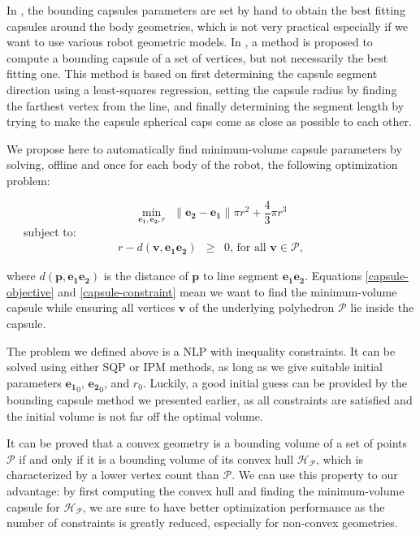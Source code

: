 In \cite{Kanoun2011}, the bounding capsules parameters are set by hand
to obtain the best fitting capsules around the body geometries, which
is not very practical especially if we want to use various robot
geometric models. In \cite{eberly20073d}, a method is proposed to
compute a bounding capsule of a set of vertices, but not necessarily
the best fitting one. This method is based on first determining the
capsule segment direction using a least-squares regression, setting
the capsule radius by finding the farthest vertex from the line, and
finally determining the segment length by trying to make the capsule
spherical caps come as close as possible to each other.

We propose here to automatically find minimum-volume capsule
parameters by solving, offline and once for each body of the robot,
the following optimization problem:

\begin{equation}
  \min_{\mathbf{e_1}, \mathbf{e_2}, r} \ \ 
  \|\mathbf{e_2} - \mathbf{e_1}\| \pi r^2 + \frac{4}{3}\pi r^3
  \label{capsule-objective}
\end{equation}
\ \ \ subject to:
\begin{equation}
  \begin{array}{rcll}
    r - d(\mathbf{\mathbf{v}},\mathbf{e_1e_2}) & \ge & 0\mbox{, for all }
    \mathbf{v} \in \mathcal{P},
    \label{capsule-constraint}
  \end{array}
\end{equation} 

where $d(\mathbf{p},\mathbf{e_1e_2})$ is the distance of $\mathbf{p}$
to line segment $\mathbf{e_1e_2}$.  Equations \ref{capsule-objective}
and \ref{capsule-constraint} mean we want to find the minimum-volume
capsule while ensuring all vertices $\mathbf{v}$ of the underlying
polyhedron $\mathcal{P}$ lie inside the capsule.

The problem we defined above is a NLP with inequality constraints. It
can be solved using either SQP or IPM methods, as long as we give
suitable initial parameters $\mathbf{e_1}_0$, $\mathbf{e_2}_0$, and
$r_0$. Luckily, a good initial guess can be provided by the bounding
capsule method we presented earlier, as all constraints are satisfied
and the initial volume is not far off the optimal volume.

It can be proved that a convex geometry is a bounding volume of a set
of points $\mathcal{P}$ if and only if it is a bounding volume of its
convex hull $\mathcal{H}_{\mathcal{P}}$, which is characterized by a
lower vertex count than $\mathcal{P}$. We can use this property to our
advantage: by first computing the convex hull and finding the
minimum-volume capsule for $\mathcal{H}_{\mathcal{P}}$, we are sure to
have better optimization performance as the number of constraints is
greatly reduced, especially for non-convex geometries.

